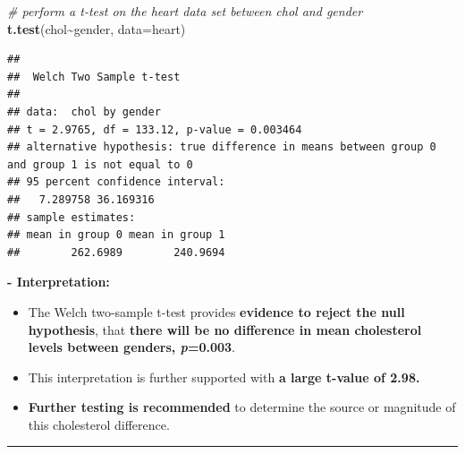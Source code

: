 \documentclass[
]{article}
\newenvironment{Shaded}{\begin{snugshade}}{\end{snugshade}}
\newcommand{\AttributeTok}[1]{\textcolor[rgb]{0.13,0.29,0.53}{#1}}
\newcommand{\CommentTok}[1]{\textcolor[rgb]{0.56,0.35,0.01}{\textit{#1}}}
\newcommand{\FunctionTok}[1]{\textcolor[rgb]{0.13,0.29,0.53}{\textbf{#1}}}
\newcommand{\NormalTok}[1]{#1}
\newcommand{\SpecialCharTok}[1]{\textcolor[rgb]{0.81,0.36,0.00}{\textbf{#1}}}
\begin{document}
\begin{enumerate}
\begin{itemize}
\begin{Shaded}
\begin{Highlighting}[]
\CommentTok{\# perform a t{-}test on the heart data set between chol and gender}
\FunctionTok{t.test}\NormalTok{(chol}\SpecialCharTok{\textasciitilde{}}\NormalTok{gender, }\AttributeTok{data=}\NormalTok{heart)}
\end{Highlighting}
\end{Shaded}

\begin{verbatim}
## 
##  Welch Two Sample t-test
## 
## data:  chol by gender
## t = 2.9765, df = 133.12, p-value = 0.003464
## alternative hypothesis: true difference in means between group 0 and group 1 is not equal to 0
## 95 percent confidence interval:
##   7.289758 36.169316
## sample estimates:
## mean in group 0 mean in group 1 
##        262.6989        240.9694
\end{verbatim}

    \textbf{- Interpretation:}

    \begin{itemize}
    \item
      The Welch two-sample t-test provides \textbf{evidence to reject
      the null hypothesis}, that \textbf{there will be no difference in
      mean cholesterol levels between genders, \emph{p}=0.003}.
    \item
      This interpretation is further supported with \textbf{a large
      t-value of 2.98.}
    \item
      \textbf{Further testing is recommended} to determine the source or
      magnitude of this cholesterol difference.
    \end{itemize}
  \end{itemize}
\end{enumerate}

\begin{center}\rule{0.5\linewidth}{0.5pt}\end{center}
\end{document}
